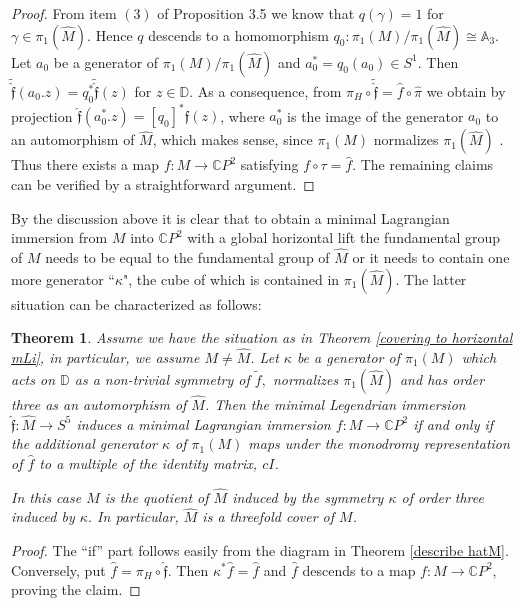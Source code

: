 \documentclass[a4paper,11pt]{amsart}
\newtheorem{theorem}{Theorem}[section]
\theoremstyle{definition}
\numberwithin{equation}{section}
\newcommand{\C}{\mathbb{C}}
\newcommand{\D}{\mathbb{D}}
\newcommand{\f}{\mathfrak{f}}
\begin{document}
 \begin{proof}
 From item $(3)$ of Proposition 3.5 we know that $q(\gamma) = 1$ for $\gamma \in \pi_1(\hat{M}).$
 Hence $q$ descends to a homomorphism $q_0:  \pi_1(M) / {\pi_1(\hat{M})} \cong \mathbb{A}_3.$
 Let $a_0$ be a generator of  $ \pi_1(M) / {\pi_1(\hat{M})} $ and $a^*_0 = q_0(a_0)  \in S^1.$  
 Then $\tilde{\hat{\f}}(a_0.z) = q_0^* {\tilde{\hat{\f}}}(z)$ for $z \in \D$.  As a consequence, 
from $  \pi_H \circ \tilde{\hat{\f} } = \hat{f} \circ \hat{\pi}$ we obtain by projection
 $\hat{\f}(a_0^*.z) = [q_0]^* \hat{\f}(z)$, where $a_0^*$ is the image of the generator $a_0$ to an automorphism of $\hat{M}$, which makes sense, since $\pi_1(M)$ normalizes $\pi_1(\hat{M})$ .
 Thus there exists a map $f: M \rightarrow \C P^2$ satisfying  $ f \circ \tau = \hat{f}$.
 The remaining claims can be verified by a straightforward argument.
 \end{proof}
 

 
 By the discussion above  it is clear that to obtain a minimal Lagrangian immersion 
 from $M$ into $\C P^2$  with a global horizontal lift the fundamental group of $M$ needs to be equal to the fundamental group of 
 $\hat{M}$ or it needs to contain one more generator ``$\kappa$", the cube of which is contained in 
 $\pi_1(\hat{M}).$  The latter situation can be characterized as follows:
 
\begin{theorem} \label{degree covering to mLi}
Assume we have the situation as in Theorem  \ref{covering to horizontal mLi}, in particular, 
we assume $M \neq \hat{M}$. Let $\kappa$ be a generator of $\pi_1(M)$ which acts on $\D$ as 
a non-trivial symmetry of $\tilde{f},$ normalizes  $ \pi_1(\hat{M})$ and has order three as an 
automorphism of $\hat{M}$.
Then the minimal Legendrian immersion $\hat{\f} : \hat{M} \rightarrow S^5$ induces a 
minimal Lagrangian immersion $f:M \rightarrow \C P^2$ if and only if the additional generator 
$\kappa$ of $\pi_1(M)$
 maps under the monodromy  representation of $\hat{f}$ to a multiple of the identity matrix, $cI$.
 
 In this case $M$ is  the quotient of $\hat{M}$ induced by the symmetry  $\kappa$  of order three
 induced by $\kappa$. In particular,  $\hat{M}$ is a threefold cover of $M$.
\end{theorem}
\begin{proof}
The ``if'' part follows easily from the diagram in Theorem  \ref{describe hatM}.
Conversely, put $\hat{f} = \pi_H \circ \hat{\f}.$ Then $\kappa^* \hat{f} = \hat{f}$ and $\hat{f}$ descends to a map
$f : M \rightarrow \C P^2$, proving the claim.
\end{proof}
\end{document}
